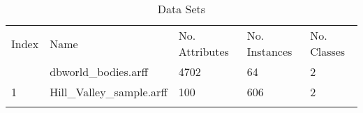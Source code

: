 \begin{table*}[h]
\caption{Data Sets}
\label{tbl:datasets}\begin{tabular}{lllll}
\noalign{\smallskip}\hline\noalign{\smallskip}
Index&Name&No. Attributes&No. Instances&No. Classes\\\noalign{\smallskip}\hline
0&dbworld_bodies.arff&4702&64&2\\
1&Hill_Valley_sample.arff&100&606&2\\
\noalign{\smallskip}\hline
\end{tabular}
\end{table*}